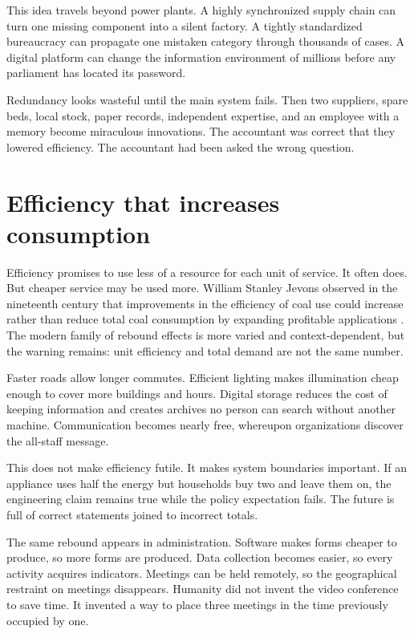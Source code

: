 \documentclass[12pt,a4paper]{book}
\begin{document}
This idea travels beyond power plants.  A highly synchronized supply chain can
turn one missing component into a silent factory.  A tightly standardized
bureaucracy can propagate one mistaken category through thousands of cases.
A digital platform can change the information environment of millions before
any parliament has located its password.

Redundancy looks wasteful until the main system fails.  Then two suppliers,
spare beds, local stock, paper records, independent expertise, and an employee
with a memory become miraculous innovations.  The accountant was correct that
they lowered efficiency.  The accountant had been asked the wrong question.

\section{Efficiency that increases consumption}

Efficiency promises to use less of a resource for each unit of service.  It
often does.  But cheaper service may be used more.  William Stanley Jevons
observed in the nineteenth century that improvements in the efficiency of coal
use could increase rather than reduce total coal consumption by expanding
profitable applications \cite{JevonsCoalQuestion1866}.  The modern family of
rebound effects is more varied and context-dependent, but the warning remains:
unit efficiency and total demand are not the same number.

Faster roads allow longer commutes.  Efficient lighting makes illumination
cheap enough to cover more buildings and hours.  Digital storage reduces the
cost of keeping information and creates archives no person can search without
another machine.  Communication becomes nearly free, whereupon organizations
discover the all-staff message.

This does not make efficiency futile.  It makes system boundaries important.
If an appliance uses half the energy but households buy two and leave them on,
the engineering claim remains true while the policy expectation fails.  The
future is full of correct statements joined to incorrect totals.

The same rebound appears in administration.  Software makes forms cheaper to
produce, so more forms are produced.  Data collection becomes easier, so
every activity acquires indicators.  Meetings can be held remotely, so the
geographical restraint on meetings disappears.  Humanity did not invent the
video conference to save time.  It invented a way to place three meetings in
the time previously occupied by one.
\end{document}
